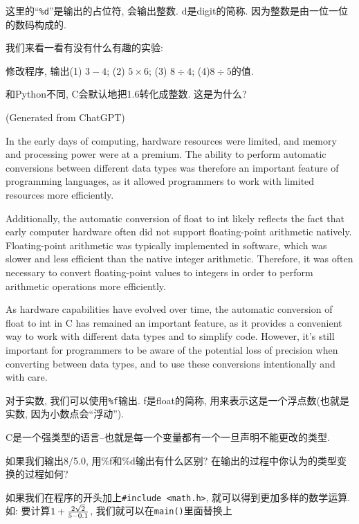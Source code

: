 这里的``\texttt{\%d}''是输出的占位符, 会输出整数. d是digit的简称. 因为整数是由一位一位的数码构成的. 

我们来看一看有没有什么有趣的实验: 

\begin{example}
	修改程序, 输出(1) $3-4$; (2) $5\times 6$; (3) $8\div 4$; (4)$8\div 5$的值.
\end{example}

和Python不同, C会默认地把1.6转化成整数. 这是为什么? 

\begin{pas}
(Generated from ChatGPT)


	In the early days of computing, hardware resources were limited, and memory and processing power were at a premium. The ability to perform automatic conversions between different data types was therefore an important feature of programming languages, as it allowed programmers to work with limited resources more efficiently.

Additionally, the automatic conversion of float to int likely reflects the fact that early computer hardware often did not support floating-point arithmetic natively. Floating-point arithmetic was typically implemented in software, which was slower and less efficient than the native integer arithmetic. Therefore, it was often necessary to convert floating-point values to integers in order to perform arithmetic operations more efficiently.

As hardware capabilities have evolved over time, the automatic conversion of float to int in C has remained an important feature, as it provides a convenient way to work with different data types and to simplify code. However, it's still important for programmers to be aware of the potential loss of precision when converting between data types, and to use these conversions intentionally and with care.
\end{pas}

对于实数, 我们可以使用\texttt{\%f}输出. f是float的简称, 用来表示这是一个浮点数(也就是实数, 因为小数点会``浮动'').  

\begin{bonus}
	C是一个强类型的语言--也就是每一个变量都有一个一旦声明不能更改的类型. 

	如果我们输出8/5.0, 用\%f和\%d输出有什么区别? 在输出的过程中你认为的类型变换的过程如何?
\end{bonus}

如果我们在程序的开头加上\texttt{\#include <math.h>}, 就可以得到更加多样的数学运算. 如: 要计算$1+{2\sqrt 2 \over 5-0.1}$, 我们就可以在\texttt{main(){}}里面替换上

